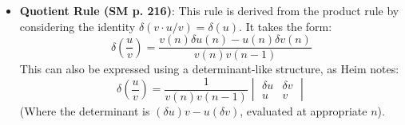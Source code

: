 \documentclass[12pt]{article}
\newcommand{\metron}{\tau}
\newcommand{\metrondifferential}{\delta}
\newcommand{\metronenziffer}{n}
\begin{document}
\begin{itemize}
\begin{itemize}
\begin{equation}
        \label{eq:original_product_rule_metrondifferential}
        \end{equation}
        Heim also provides alternative, often more convenient or directly derivable forms, such as: \( \metrondifferential(uv) = u(\metronenziffer)\metrondifferential v(\metronenziffer) + v(\metronenziffer-1)\metrondifferential u(\metronenziffer) \) or, symmetrically, \( \metrondifferential(uv) = v(\metronenziffer)\metrondifferential u(\metronenziffer) + u(\metronenziffer-1)\metrondifferential v(\metronenziffer) \). The presence of the terms \( v(\metronenziffer-1) \) or \( u(\metronenziffer-1) \) (where, for example, \( v(\metronenziffer-1) = v(\metronenziffer) - \metrondifferential v(\metronenziffer) \)) directly reflects the backward difference definition of the \( \metrondifferential \) operator. The term \( -\metrondifferential u(\metronenziffer)\metrondifferential v(\metronenziffer) \) in the symmetric form explicitly captures the second-order effect that arises due to the finite step size of the Metron; this term naturally vanishes in the infinitesimal limit (\( \metron \to 0 \)) where \( (\metrondifferential u)(\metrondifferential v) \) would become a higher-order infinitesimal.
            \item \textbf{Quotient Rule (SM p. 216)}: This rule is derived from the product rule by considering the identity \( \metrondifferential(v \cdot u/v) = \metrondifferential(u) \). It takes the form:
    \[ \metrondifferential\left(\frac{u}{v}\right) = \frac{v(\metronenziffer)\metrondifferential u(\metronenziffer) - u(\metronenziffer)\metrondifferential v(\metronenziffer)}{v(\metronenziffer)v(\metronenziffer-1)} \]
    This can also be expressed using a determinant-like structure, as Heim notes:
    \[ \metrondifferential\left(\frac{u}{v}\right) = \frac{1}{v(\metronenziffer)v(\metronenziffer-1)} \begin{vmatrix} \metrondifferential u & \metrondifferential v \\ u & v \end{vmatrix} \]
    (Where the determinant is \( (\metrondifferential u)v - u(\metrondifferential v) \), evaluated at appropriate \(n\)).
    \end{itemize}


\end{itemize}
\end{document}
